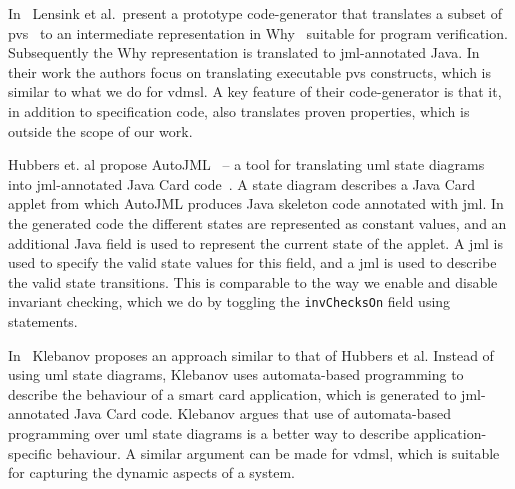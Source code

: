 In~\cite{Lensink&12} Lensink et al.\ present a prototype
code-generator that translates a subset of \ac{pvs}~\cite{Owre&92} to
an intermediate representation in Why~\cite{Filliatre03} suitable for
program verification. Subsequently the Why representation is
translated to \ac{jml}-annotated Java. In their work the authors focus
on translating executable \ac{pvs} constructs, which is similar to
what we do for \ac{vdmsl}. A key feature of their code-generator is
that it, in addition to specification code, also translates proven
properties, which is outside the scope of our work.

Hubbers et. al propose AutoJML~\cite{Hubbers&03a} -- a tool for
translating \ac{uml} state diagrams into \ac{jml}-annotated Java Card
code~\cite{Chen&00}. A state diagram describes a Java Card applet from
which AutoJML produces Java skeleton code annotated with \ac{jml}. In
the generated code the different states are represented as constant
values, and an additional Java field is used to represent the current
state of the applet. A \ac{jml}  is used to specify the
valid state values for this field, and a \ac{jml}  is
used to describe the valid state transitions. This is comparable to
the way we enable and disable invariant checking, which we do by
toggling the \texttt{invChecksOn}  field using 
statements.

In~\cite{Klebanov&08} Klebanov proposes an approach similar to that of
Hubbers et al. Instead of using \ac{uml} state diagrams, Klebanov uses
automata-based programming to describe the behaviour of a smart card
application, which is generated to \ac{jml}-annotated Java Card
code. Klebanov argues that use of automata-based programming over
\ac{uml} state diagrams is a better way to describe
application-specific behaviour. A similar argument can be made for
\ac{vdmsl}, which is suitable for capturing the dynamic aspects of a
system.

